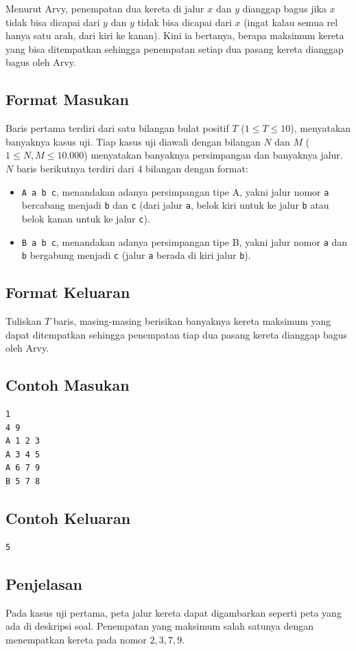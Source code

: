 \documentclass{article}
\begin{document}
Menurut Arvy, penempatan dua kereta di jalur $x$ dan $y$ dianggap bagus jika $x$ tidak bisa dicapai dari $y$ dan $y$ tidak bisa dicapai dari $x$ (ingat kalau semua rel hanya satu arah, dari kiri ke kanan).
Kini ia bertanya, berapa maksimum kereta yang bisa ditempatkan sehingga penempatan setiap dua pasang kereta dianggap bagus oleh Arvy.

\subsection*{Format Masukan}
Baris pertama terdiri dari satu bilangan bulat positif $T$ ($1 \leq T \leq 10$), menyatakan banyaknya kasus uji.
Tiap kasus uji diawali dengan bilangan $N$ dan $M$ ($1 \leq N, M \leq 10.000$) menyatakan banyaknya persimpangan dan banyaknya jalur.
$N$ baris berikutnya terdiri dari 4 bilangan dengan format:
\begin{itemize}
    \setlength{\itemsep}{0pt}
    \item \lstinline{A a b c}, menandakan adanya persimpangan tipe A, yakni jalur nomor \lstinline{a} bercabang menjadi \lstinline{b} dan \lstinline{c} (dari jalur \lstinline{a}, belok kiri untuk ke jalur \lstinline{b} atau belok kanan untuk ke jalur \lstinline{c}).
    \item \lstinline{B a b c}, menandakan adanya persimpangan tipe B, yakni jalur nomor \lstinline{a} dan \lstinline{b} bergabung menjadi \lstinline{c} (jalur \lstinline{a} berada di kiri jalur \lstinline{b}).
\end{itemize}

\subsection*{Format Keluaran}
Tuliskan $T$ baris, masing-masing berisikan banyaknya kereta maksimum yang dapat ditempatkan sehingga penempatan tiap dua pasang kereta dianggap bagus oleh Arvy.

\pagebreak

\begin{multicols}{2}
\subsection*{Contoh Masukan}
\begin{lstlisting}
1
4 9
A 1 2 3
A 3 4 5
A 6 7 9
B 5 7 8
\end{lstlisting}
\columnbreak
\subsection*{Contoh Keluaran}
\begin{lstlisting}
5
\end{lstlisting}
\vfill
\null
\end{multicols}

\subsection*{Penjelasan}
Pada kasus uji pertama, peta jalur kereta dapat digambarkan seperti peta yang ada di deskripsi soal. Penempatan yang maksimum salah satunya dengan menempatkan kereta pada nomor $2, 3, 7, 9$.
\end{document}
